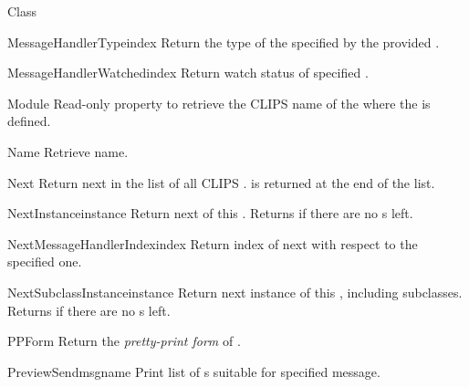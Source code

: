 \begin{classdesc*}{Class}
\begin{methoddesc}{MessageHandlerType}{index}
Return the type of the  specified by the provided
.
\end{methoddesc}

\begin{methoddesc}{MessageHandlerWatched}{index}
Return watch status of specified .
\end{methoddesc}

\begin{memberdesc}[property]{Module}
Read-only property to retrieve the CLIPS name of the 
where the  is defined.
\end{memberdesc}

\begin{memberdesc}[property]{Name}
Retrieve  name.
\end{memberdesc}

\begin{methoddesc}{Next}{}
Return next  in the list of all CLIPS .
 is returned at the end of the list.
\end{methoddesc}

\begin{methoddesc}{NextInstance}{instance}
Return next  of this . Returns  if
there are no s left.
\end{methoddesc}

\begin{methoddesc}{NextMessageHandlerIndex}{index}
Return index of next  with respect to the specified
one.
\end{methoddesc}

\begin{methoddesc}{NextSubclassInstance}{instance}
Return next instance of this , including subclasses. Returns
 if there are no s left.
\end{methoddesc}

\begin{methoddesc}{PPForm}{}
Return the \emph{pretty-print form} of .
\end{methoddesc}

\begin{methoddesc}{PreviewSend}{msgname}
Print list of s suitable for specified message.
\end{methoddesc}


\end{classdesc*}
